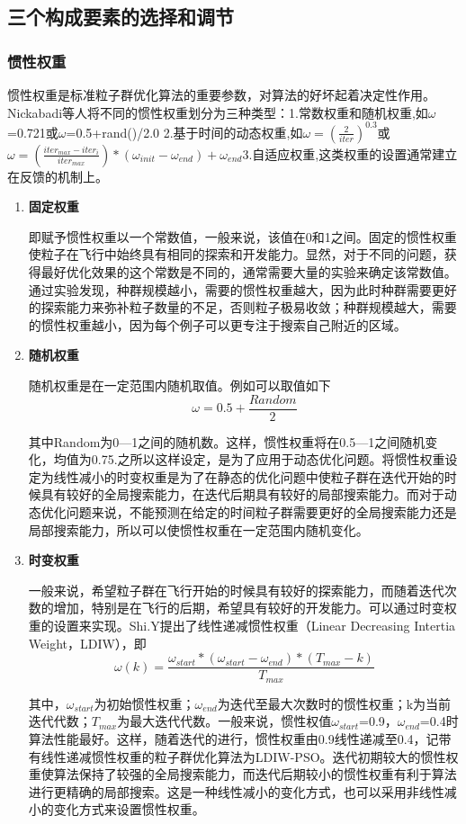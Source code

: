\subsection{三个构成要素的选择和调节}
\subsubsection{惯性权重}
惯性权重是标准粒子群优化算法的重要参数，对算法的好坏起着决定性作用。Nickabadi等人将不同的惯性权重划分为三种类型：1.常数权重和随机权重,如$\omega$=0.721或$\omega$=0.5+rand()/2.0
	2.基于时间的动态权重,如$\omega={(\frac{2}{iter})}^{0.3}$或$\omega=(\frac{{iter}_{max}-{iter}_i}{{iter}_{max}})*(\omega_{init}-\omega_{end})+\omega_{end}$3.自适应权重,这类权重的设置通常建立在反馈的机制上。
\begin{enumerate}
	\item \textbf{固定权重}
	
	\hspace{2em} 即赋予惯性权重以一个常数值，一般来说，该值在0和1之间。固定的惯性权重使粒子在飞行中始终具有相同的探索和开发能力。显然，对于不同的问题，获得最好优化效果的这个常数是不同的，通常需要大量的实验来确定该常数值。通过实验发现，种群规模越小，需要的惯性权重越大，因为此时种群需要更好的探索能力来弥补粒子数量的不足，否则粒子极易收敛；种群规模越大，需要的惯性权重越小，因为每个例子可以更专注于搜索自己附近的区域。
	\item \textbf{随机权重}
	
	\hspace{2em}随机权重是在一定范围内随机取值。例如可以取值如下$$\omega=0.5+\frac{Random}{2}$$
	
	其中Random为0—1之间的随机数。这样，惯性权重将在0.5—1之间随机变化，均值为0.75.之所以这样设定，是为了应用于动态优化问题。将惯性权重设定为线性减小的时变权重是为了在静态的优化问题中使粒子群在迭代开始的时候具有较好的全局搜索能力，在迭代后期具有较好的局部搜索能力。而对于动态优化问题来说，不能预测在给定的时间粒子群需要更好的全局搜索能力还是局部搜索能力，所以可以使惯性权重在一定范围内随机变化。
	\item \textbf{时变权重}
	
	\hspace{2em}一般来说，希望粒子群在飞行开始的时候具有较好的探索能力，而随着迭代次数的增加，特别是在飞行的后期，希望具有较好的开发能力。可以通过时变权重的设置来实现。Shi.Y提出了线性递减惯性权重（Linear Decreasing Intertia Weight，LDIW），即$$\omega(k)=\frac{\omega_{start}*(\omega_{start}-\omega_{end})*(T_{max}-k)}{T_{max}}$$
	
	\hspace{2em}其中，$\omega_{start}$为初始惯性权重；$\omega_{end}$为迭代至最大次数时的惯性权重；k为当前迭代代数；$T_{max}$为最大迭代代数。一般来说，惯性权值$\omega_{start}$=0.9，$\omega_{end}$=0.4时算法性能最好。这样，随着迭代的进行，惯性权重由0.9线性递减至0.4，记带有线性递减惯性权重的粒子群优化算法为LDIW-PSO。迭代初期较大的惯性权重使算法保持了较强的全局搜索能力，而迭代后期较小的惯性权重有利于算法进行更精确的局部搜索。这是一种线性减小的变化方式，也可以采用非线性减小的变化方式来设置惯性权重。
	

\end{enumerate}
